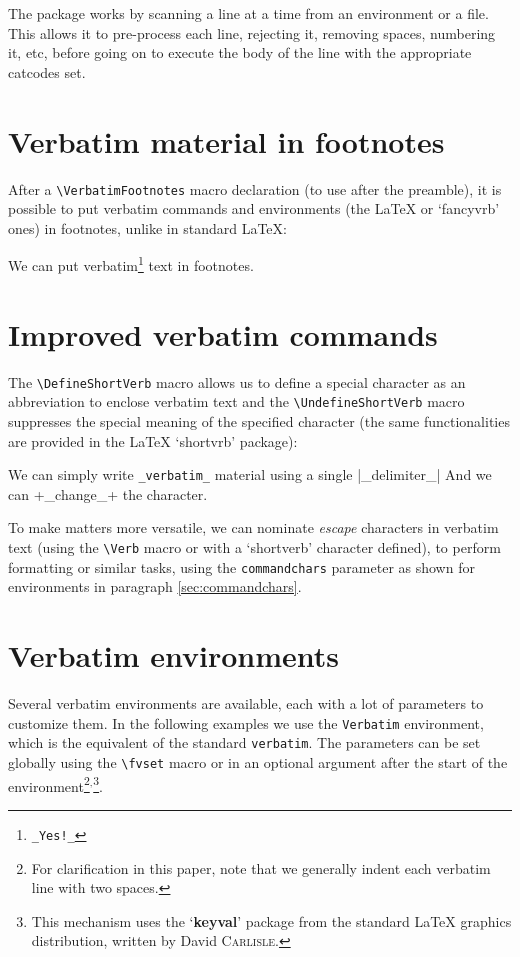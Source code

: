 \documentclass{article}
\newcommand\FVrbPackage{`\textsf{fancyvrb}'}
\newcommand\cs[1]{\texttt{\textbackslash#1}}
\begin{document}
  The package works by scanning a line at a time from an environment or a
file. This allows it to pre-process each line, rejecting it, removing
spaces, numbering it, etc, before going on to execute the body of the line
with the appropriate catcodes set.

\section{Verbatim material in footnotes}

  After a \cs{VerbatimFootnotes} macro declaration (to use after the
preamble), it is possible to put verbatim commands and environments
(the \LaTeX{} or \FVrbPackage{} ones) in footnotes, unlike in standard
\LaTeX:

\begin{Example}
  \VerbatimFootnotes
  We can put verbatim\footnote{\verb+_Yes!_+} text in footnotes.
\end{Example}

\section{Improved verbatim commands}
%
  The \cs{DefineShortVerb} macro allows us to define a special character as
an abbreviation to enclose verbatim text and the \cs{UndefineShortVerb}
macro suppresses the special meaning of the specified character (the same
functionalities are provided in the \LaTeX{} `\textsf{shortvrb}' package):


\begin{SideBySideExample}
  \DefineShortVerb{\|}
  We can simply write \Verb+_verbatim_+
  material using a single |_delimiter_|
  \UndefineShortVerb{\|}
  \DefineShortVerb{\+}
  And we can +_change_+ the character.
\end{SideBySideExample}

  To make matters more versatile, we can nominate \emph{escape} characters
in verbatim text (using the \cs{Verb} macro or with a `shortverb' character
defined), to perform formatting or similar tasks, using the
\texttt{commandchars} parameter as shown for environments in paragraph
\ref{sec:commandchars}.

\section{Verbatim environments}

Several verbatim environments are available, each with a lot of
parameters to customize them. In the following examples we use the
\texttt{Verbatim} environment, which is the equivalent of the standard
\texttt{verbatim}. The parameters can be set globally using the \cs{fvset}
macro or in an optional argument after the start of the
environment\footnote{For clarification in this paper, note that we
generally indent each verbatim line with two
spaces.}$^,$\footnote{This mechanism uses the
`\textbf{keyval}' package from the standard \LaTeX{} graphics
distribution, written by David \textsc{Carlisle}.}.
\end{document}

